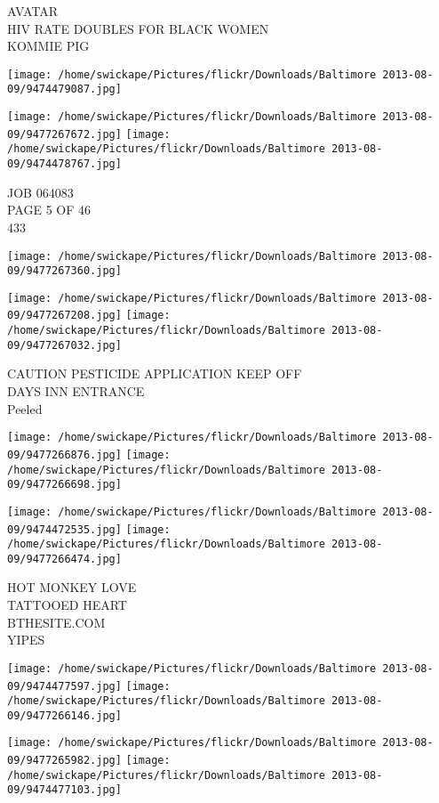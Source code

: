 \documentclass[10pt,letterpaper]{article}
\begin{document}
AVATAR\\
HIV RATE DOUBLES FOR BLACK WOMEN\\
KOMMIE PIG
\pagebreak

\texttt{[image: /home/swickape/Pictures/flickr/Downloads/Baltimore 2013-08-09/9474479087.jpg]}

\vspace{0.25in}
\texttt{[image: /home/swickape/Pictures/flickr/Downloads/Baltimore 2013-08-09/9477267672.jpg]}
\texttt{[image: /home/swickape/Pictures/flickr/Downloads/Baltimore 2013-08-09/9474478767.jpg]}

JOB 064083\\
PAGE 5 OF 46\\
433
\pagebreak

\texttt{[image: /home/swickape/Pictures/flickr/Downloads/Baltimore 2013-08-09/9477267360.jpg]}

\vspace{0.25in}
\texttt{[image: /home/swickape/Pictures/flickr/Downloads/Baltimore 2013-08-09/9477267208.jpg]}
\texttt{[image: /home/swickape/Pictures/flickr/Downloads/Baltimore 2013-08-09/9477267032.jpg]}

CAUTION PESTICIDE APPLICATION KEEP OFF\\
DAYS INN ENTRANCE\\
Peeled
\pagebreak

\texttt{[image: /home/swickape/Pictures/flickr/Downloads/Baltimore 2013-08-09/9477266876.jpg]}
\texttt{[image: /home/swickape/Pictures/flickr/Downloads/Baltimore 2013-08-09/9477266698.jpg]}

\texttt{[image: /home/swickape/Pictures/flickr/Downloads/Baltimore 2013-08-09/9474472535.jpg]}
\texttt{[image: /home/swickape/Pictures/flickr/Downloads/Baltimore 2013-08-09/9477266474.jpg]}

HOT MONKEY LOVE\\
TATTOOED HEART\\
BTHESITE.COM\\
YIPES
\pagebreak

\texttt{[image: /home/swickape/Pictures/flickr/Downloads/Baltimore 2013-08-09/9474477597.jpg]}
\texttt{[image: /home/swickape/Pictures/flickr/Downloads/Baltimore 2013-08-09/9477266146.jpg]}

\texttt{[image: /home/swickape/Pictures/flickr/Downloads/Baltimore 2013-08-09/9477265982.jpg]}
\texttt{[image: /home/swickape/Pictures/flickr/Downloads/Baltimore 2013-08-09/9474477103.jpg]}
\end{document}
